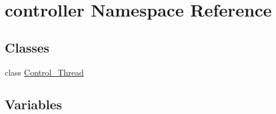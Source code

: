 \hypertarget{namespacecontroller}{}\section{controller Namespace Reference}
\label{namespacecontroller}
\subsection*{Classes}
\begin{DoxyCompactItemize}
\item 
class \mbox{\hyperlink{classcontroller_1_1_control___thread}{Control\+\_\+\+Thread}}
\end{DoxyCompactItemize}
\subsection*{Variables}
